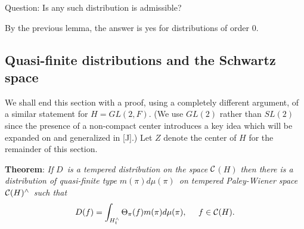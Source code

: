 {\sc Question}: Is any such distribution is admissible?

By the previous lemma, the answer is yes for distributions of order $0$.

\subsection{Quasi-finite distributions and the Schwartz space}

We shall end this section with a proof, using a completely different
argument, of a similar statement for $H=GL(2,F)$. (We use $GL(2)$ rather
than $SL(2)$ since the presence of a non-compact center introduces a key
idea which will be expanded on and generalized in [J].) Let $Z$ denote the
center of $H$ for the remainder of this section.

{\bf Theorem}: {\em If }$D${\em \ is a tempered distribution on the space }$%
{\cal C}${\em $(H)$ then there is a distribution of quasi-finite type }$%
m(\pi )d\mu (\pi )${\em \ on tempered Paley-Wiener space }${\cal C}%
(H)^{\wedge }${\em \ such that} 
\[
D(f)=\int_{H_t^{\wedge }}\Theta _\pi (f)m(\pi )d\mu (\pi ),\;\;\;\;\;f\in 
{\cal C}(H). 
\]

